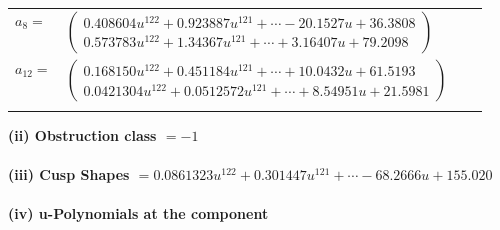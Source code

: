 \documentclass[1p]{elsarticle_modified}
\theoremstyle{definition}
\begin{document}
\begin{tabular}{m{7pt} m{180pt} m{7pt} m{180pt} }
\flushright $a_{8}=$&$\begin{pmatrix}0.408604 u^{122}+0.923887 u^{121}+\cdots-20.1527 u+36.3808\\0.573783 u^{122}+1.34367 u^{121}+\cdots+3.16407 u+79.2098\end{pmatrix}$ \\
\flushright $a_{12}=$&$\begin{pmatrix}0.168150 u^{122}+0.451184 u^{121}+\cdots+10.0432 u+61.5193\\0.0421304 u^{122}+0.0512572 u^{121}+\cdots+8.54951 u+21.5981\end{pmatrix}$\\&\end{tabular}
\flushleft \textbf{(ii) Obstruction class $= -1$}\\~\\
\flushleft \textbf{(iii) Cusp Shapes $= 0.0861323 u^{122}+0.301447 u^{121}+\cdots-68.2666 u+155.020$}\\~\\
\newpage\renewcommand{\arraystretch}{1}
\flushleft \textbf{(iv) u-Polynomials at the component}\newline \\
\end{document}
